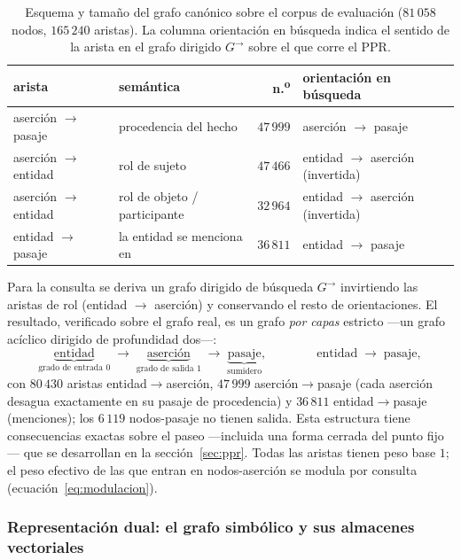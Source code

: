 \documentclass[11pt,a4paper]{article}
\begin{document}
\begin{table}[t]
\centering\small
\caption{Esquema y tamaño del grafo canónico sobre el corpus de evaluación
($81\,058$ nodos, $165\,240$ aristas). La columna \guillemotleft{}orientación en búsqueda\guillemotright{}
indica el sentido de la arista en el grafo dirigido $G^{\!\rightarrow}$ sobre
el que corre el PPR.}
\label{tab:grafo}
\begin{tabular}{llrl}
\toprule
arista & semántica & n.\textsuperscript{o} & orientación en búsqueda\\
\midrule
aserción $\to$ pasaje   & procedencia del hecho          & $47\,999$ & aserción $\to$ pasaje\\
aserción $\to$ entidad  & rol de sujeto                  & $47\,466$ & entidad $\to$ aserción (invertida)\\
aserción $\to$ entidad  & rol de objeto / participante   & $32\,964$ & entidad $\to$ aserción (invertida)\\
entidad $\to$ pasaje    & la entidad se menciona en      & $36\,811$ & entidad $\to$ pasaje\\
\bottomrule
\end{tabular}
\end{table}

Para la consulta se deriva un grafo dirigido de búsqueda
$G^{\!\rightarrow}$ invirtiendo las aristas de rol (entidad $\to$
aserción) y conservando el resto de orientaciones. El resultado, verificado
sobre el grafo real, es un grafo \emph{por capas} estricto ---un grafo
acíclico dirigido de profundidad dos---:
\[
\underbrace{\text{entidad}}_{\text{grado de entrada }0}
\;\longrightarrow\;
\underbrace{\text{aserción}}_{\text{grado de salida }1}
\;\longrightarrow\;
\underbrace{\text{pasaje}}_{\text{sumidero}},
\qquad\qquad
\text{entidad} \;\longrightarrow\; \text{pasaje},
\]
con $80\,430$ aristas entidad$\to$aserción, $47\,999$ aserción$\to$pasaje
(cada aserción desagua exactamente en su pasaje de procedencia) y
$36\,811$ entidad$\to$pasaje (menciones); los $6\,119$ nodos-pasaje no
tienen salida. Esta estructura tiene consecuencias exactas sobre el paseo
---incluida una forma cerrada del punto fijo--- que se desarrollan en la
sección~\ref{sec:ppr}. Todas las aristas tienen peso base $1$; el peso
efectivo de las que entran en nodos-aserción se modula por consulta
(ecuación~\ref{eq:modulacion}).

\subsubsection{Representación dual: el grafo simbólico y sus almacenes
vectoriales}
\label{sec:dual}
\end{document}

